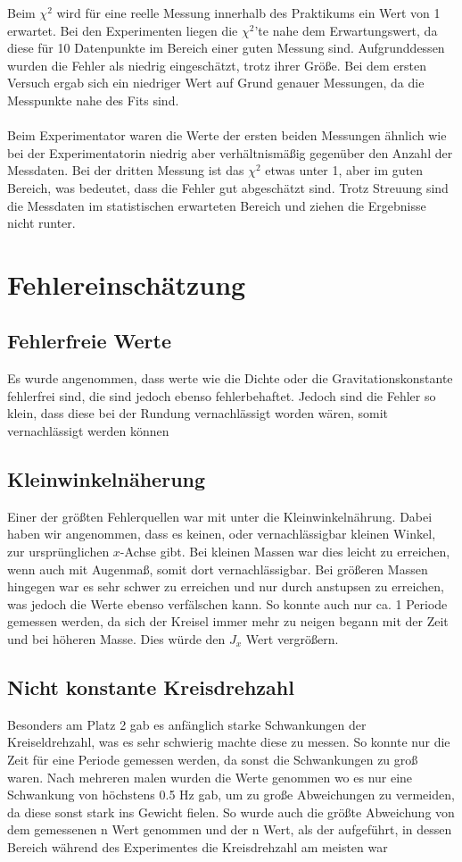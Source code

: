 \documentclass[bibliography=totocnumbered]{scrartcl}
\begin{document}
	Beim $ \chi^{2} $ wird für eine reelle Messung innerhalb des Praktikums ein Wert von 1 erwartet.
	Bei den Experimenten liegen die $ \chi^{2} $'te nahe dem Erwartungswert, da diese für 10 Datenpunkte im
	Bereich einer guten Messung sind. Aufgrunddessen wurden die Fehler als niedrig eingeschätzt, trotz ihrer Größe.
	Bei dem ersten Versuch ergab sich ein niedriger Wert auf Grund genauer Messungen, da die
	Messpunkte nahe des Fits sind.\\\\
	Beim Experimentator waren die Werte der ersten beiden Messungen ähnlich wie bei der
	Experimentatorin niedrig aber verhältnismäßig gegenüber den Anzahl der Messdaten.
	Bei der dritten Messung ist das $ \chi^{2} $ etwas unter 1, aber im guten Bereich, was bedeutet, dass die Fehler gut
	abgeschätzt sind. Trotz Streuung sind die Messdaten im statistischen erwarteten Bereich und ziehen die
	Ergebnisse nicht runter. 
	
	\section{Fehlereinschätzung}
	\subsection{Fehlerfreie Werte}
	Es wurde angenommen, dass werte wie die Dichte oder die Gravitationskonstante fehlerfrei sind, die sind jedoch ebenso fehlerbehaftet. Jedoch sind die Fehler so klein, dass diese bei der Rundung vernachlässigt worden wären, somit vernachlässigt werden können
	\subsection{Kleinwinkelnäherung}
	Einer der größten Fehlerquellen war mit unter die Kleinwinkelnährung. Dabei haben wir angenommen, dass es keinen, oder vernachlässigbar kleinen Winkel, zur ursprünglichen $ x $-Achse gibt.
	Bei kleinen Massen war dies leicht zu erreichen, wenn auch mit Augenmaß, somit dort vernachlässigbar. Bei größeren Massen hingegen war es sehr schwer zu erreichen und nur durch anstupsen zu erreichen, was jedoch die Werte ebenso verfälschen kann.
	So konnte auch nur ca. 1 Periode gemessen werden, da sich der Kreisel immer mehr zu neigen begann mit der Zeit und bei höheren Masse.
	Dies würde den $ J_{x} $ Wert vergrößern.
	\subsection{Nicht konstante Kreisdrehzahl}
	Besonders am Platz 2 gab es anfänglich starke Schwankungen der Kreiseldrehzahl, was es sehr schwierig machte diese zu messen. So konnte nur die Zeit für eine Periode gemessen werden, da sonst die Schwankungen zu groß waren. Nach mehreren malen wurden die Werte genommen wo es nur eine Schwankung von höchstens 0.5 Hz gab, um zu große Abweichungen zu vermeiden, da diese sonst stark ins Gewicht fielen. So wurde auch die größte Abweichung von dem gemessenen n Wert genommen und der n Wert, als der aufgeführt, in dessen Bereich während des Experimentes die Kreisdrehzahl am meisten war
\end{document}
